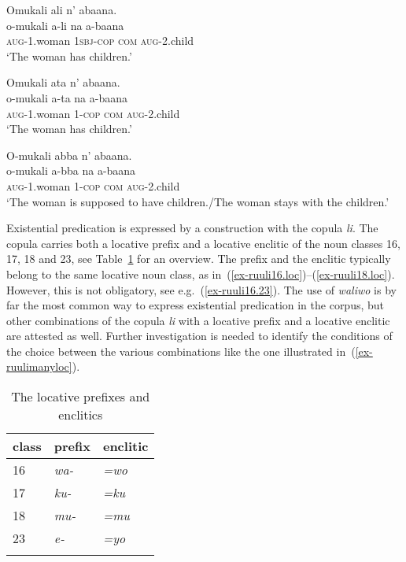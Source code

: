 \ea \label{ex-ruulipredicativeposs}
\begin{xlist}
	\ex \label{ex-ruulilina}
	\glll Omukali ali n' abaana.\\
	  o-mukali a-li na a-baana\\
		\textsc{aug}-1.woman \textsc{1sbj}-\textsc{cop} \textsc{com} \textsc{aug}-2.child\\
	\glt ‘The woman has children.’ 

\ex \label{ex-ruulitaana}
	\glll Omukali ata n' abaana.\\
	  o-mukali a-ta na a-baana\\
		\textsc{aug}-1.woman 1-\textsc{cop} \textsc{com} \textsc{aug}-2.child\\
	\glt ‘The woman has children.’ 	

\ex \label{ex-ruulibbana}
	\glll O-mukali abba n' abaana.\\
	 o-mukali a-bba na a-baana\\
		\textsc{aug}-1.woman 1-\textsc{cop} \textsc{com} \textsc{aug}-2.child\\
\glt ‘The woman is supposed to have children./The woman stays with the children.’
\end{xlist}
\z

Existential predication is expressed by a construction with the copula \textit{li}. 
The copula carries both a locative prefix and a locative enclitic of the noun classes 16, 17, 18 and 23, see Table~\ref{tab:locprefixes} for an overview.  
The prefix and the enclitic typically belong to the same locative noun class, as in~(\ref{ex-ruuli16.loc})--(\ref{ex-ruuli18.loc}). 
However, this is not obligatory, see e.g.\, (\ref{ex-ruuli16.23}). 
The use of \textit{waliwo} is by far the most common way to express existential predication in the corpus, 
but other combinations of the copula \textit{li} with a locative prefix and a locative enclitic are attested as well.
Further investigation is needed to identify the conditions of the choice between the various combinations like the one illustrated in~(\ref{ex-ruulimanyloc}).

\begin{table}

\caption{The locative prefixes and enclitics}
\label{tab:locprefixes}
	\begin{tabular}{lll}
\lsptoprule
	class&prefix&enclitic\\
\midrule
	16&\textit{wa-}&\textit{=wo}\\
	17&\textit{ku-}&\textit{=ku}\\
	18&\textit{mu-}&\textit{=mu}\\
	23&\textit{e-}&\textit{=yo}\\
\lspbottomrule
	\end{tabular}
\end{table}


